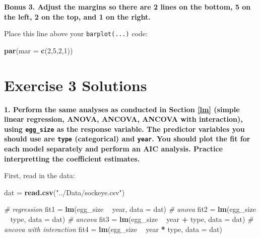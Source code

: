 \documentclass[]{book}
\newenvironment{Shaded}{\begin{snugshade}}{\end{snugshade}}
\newcommand{\KeywordTok}[1]{\textcolor[rgb]{0.13,0.29,0.53}{\textbf{#1}}}
\newcommand{\DataTypeTok}[1]{\textcolor[rgb]{0.13,0.29,0.53}{#1}}
\newcommand{\DecValTok}[1]{\textcolor[rgb]{0.00,0.00,0.81}{#1}}
\newcommand{\StringTok}[1]{\textcolor[rgb]{0.31,0.60,0.02}{#1}}
\newcommand{\CommentTok}[1]{\textcolor[rgb]{0.56,0.35,0.01}{\textit{#1}}}
\newcommand{\OperatorTok}[1]{\textcolor[rgb]{0.81,0.36,0.00}{\textbf{#1}}}
\newcommand{\NormalTok}[1]{#1}
\theoremstyle{definition}
\theoremstyle{definition}
\theoremstyle{definition}
\theoremstyle{remark}
\begin{document}
\textbf{Bonus 3. Adjust the margins so there are 2 lines on the bottom,
5 on the left, 2 on the top, and 1 on the right.}

Place this line above your \texttt{barplot(...)} code:

\begin{Shaded}
\begin{Highlighting}[]
\KeywordTok{par}\NormalTok{(}\DataTypeTok{mar =} \KeywordTok{c}\NormalTok{(}\DecValTok{2}\NormalTok{,}\DecValTok{5}\NormalTok{,}\DecValTok{2}\NormalTok{,}\DecValTok{1}\NormalTok{))}
\end{Highlighting}
\end{Shaded}

\hypertarget{ex3-answers}{\section*{Exercise 3
Solutions}\label{ex3-answers}}

\textbf{1. Perform the same analyses as conducted in Section \ref{lm}
(simple linear regression, ANOVA, ANCOVA, ANCOVA with interaction),
using \texttt{egg\_size} as the response variable. The predictor
variables you should use are \texttt{type} (categorical) and
\texttt{year}. You should plot the fit for each model separately and
perform an AIC analysis. Practice interpretting the coefficient
estimates.}

First, read in the data:

\begin{Shaded}
\begin{Highlighting}[]
\NormalTok{dat =}\StringTok{ }\KeywordTok{read.csv}\NormalTok{(}\StringTok{"../Data/sockeye.csv"}\NormalTok{)}
\end{Highlighting}
\end{Shaded}

\begin{Shaded}
\begin{Highlighting}[]
\CommentTok{# regression}
\NormalTok{fit1 =}\StringTok{ }\KeywordTok{lm}\NormalTok{(egg_size }\OperatorTok{~}\StringTok{ }\NormalTok{year, }\DataTypeTok{data =}\NormalTok{ dat)}
\CommentTok{# anova}
\NormalTok{fit2 =}\StringTok{ }\KeywordTok{lm}\NormalTok{(egg_size }\OperatorTok{~}\StringTok{ }\NormalTok{type, }\DataTypeTok{data =}\NormalTok{ dat)}
\CommentTok{# ancova}
\NormalTok{fit3 =}\StringTok{ }\KeywordTok{lm}\NormalTok{(egg_size }\OperatorTok{~}\StringTok{ }\NormalTok{year }\OperatorTok{+}\StringTok{ }\NormalTok{type, }\DataTypeTok{data =}\NormalTok{ dat)}
\CommentTok{# ancova with interaction}
\NormalTok{fit4 =}\StringTok{ }\KeywordTok{lm}\NormalTok{(egg_size }\OperatorTok{~}\StringTok{ }\NormalTok{year }\OperatorTok{*}\StringTok{ }\NormalTok{type, }\DataTypeTok{data =}\NormalTok{ dat)}
\end{Highlighting}
\end{Shaded}
\end{document}
